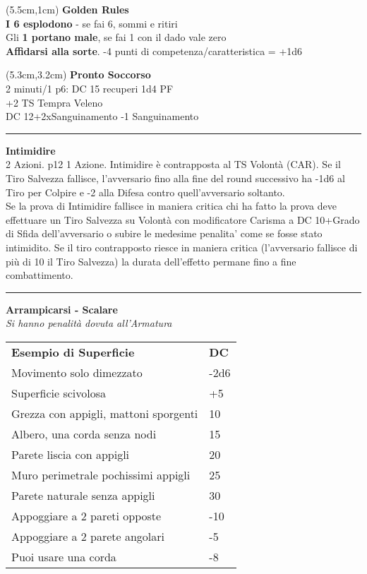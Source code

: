 \documentclass[a4paper,12 pt,openany]{book}
\newcommand{\riga}{\rule{\textwidth}{0.4pt}}
\begin{document}
\begin{textblock*}{14.5cm}(5.5cm,1cm) %
\textbf{Golden Rules}\\

{\textbf{I 6 esplodono}} - se fai 6, sommi e ritiri\\
Gli \textbf{1 portano male}, se fai 1 con il dado vale zero\\
\textbf{Affidarsi alla sorte}. -4 punti di competenza/caratteristica = +1d6\\
\end{textblock*}


\begin{textblock*}{7.4cm}(5.3cm,3.2cm) %
\textbf{Pronto Soccorso}\\
2 minuti/1 p6: DC 15 recuperi 1d4 PF\\
+2 TS Tempra Veleno\\
DC 12+2xSanguinamento -1 Sanguinamento

\riga

\textbf{Intimidire}\\
2 Azioni. p12 1 Azione. Intimidire è contrapposta al TS Volontà (CAR). Se il Tiro Salvezza fallisce, l’avversario fino alla fine del round successivo ha -1d6 al Tiro per Colpire e -2 alla Difesa contro quell’avversario soltanto.\\
Se la prova di Intimidire fallisce in maniera critica chi ha fatto la prova deve effettuare un Tiro Salvezza su Volontà con modificatore Carisma a DC 10+Grado di Sfida dell’avversario o subire le medesime penalita’ come se fosse stato intimidito. Se il tiro contrapposto riesce in maniera critica (l’avversario fallisce di più di 10 il Tiro Salvezza) la durata dell’effetto permane fino a fine combattimento.

\riga

\textbf{Arrampicarsi - Scalare}\\
\textit{Si hanno penalità dovuta all'Armatura}

\begin{tabular}{ll}
\textbf{Esempio di Superficie} & \textbf{DC}\\
Movimento solo dimezzato & -2d6\\
Superficie scivolosa&+5\\
Grezza con appigli, mattoni sporgenti&10\\
Albero, una corda senza nodi&15\\
Parete liscia con appigli &20\\
Muro perimetrale pochissimi appigli&25\\
Parete naturale senza appigli&30\\
Appoggiare a 2 pareti opposte&-10\\
Appoggiare a 2 parete angolari&-5\\
Puoi usare una corda&-8\\
\end{tabular}


\end{textblock*}
\end{document}
